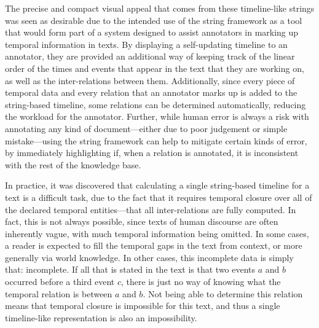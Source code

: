 \documentclass[a4paper,12pt,leqno,twoside]{article}
\begin{document}
The precise and compact visual appeal that comes from these timeline-like strings was seen as desirable due to the intended use of the string framework as a tool that would form part of a system designed to assist annotators in marking up temporal information in texts. By displaying a self-updating timeline to an annotator, they are provided an additional way of keeping track of the linear order of the times and events that appear in the text that they are working on, as well as the inter-relations between them. Additionally, since every piece of temporal data and every relation that an annotator marks up is added to the string-based timeline, some relations can be determined automatically, reducing the workload for the annotator. Further, while human error is always a risk with annotating any kind of document---either due to poor judgement or simple mistake---using the string framework can help to mitigate certain kinds of error, by immediately highlighting if, when a relation is annotated, it is inconsistent with the rest of the knowledge base.

In practice, it was discovered that calculating a single string-based timeline for a text is a difficult task, due to the fact that it requires temporal closure over all of the declared temporal entities---that all inter-relations are fully computed. In fact, this is not always possible, since texts of human discourse are often inherently vague, with much temporal information being omitted. In some cases, a reader is expected to fill the temporal gaps in the text from context, or more generally via world knowledge. In other cases, this incomplete data is simply that: incomplete. If all that is stated in the text is that two events $a$ and $b$ occurred before a third event $c$, there is just no way of knowing what the temporal relation is between $a$ and $b$. Not being able to determine this relation means that temporal closure is impossible for this text, and thus a single timeline-like representation is also an impossibility.
\end{document}
